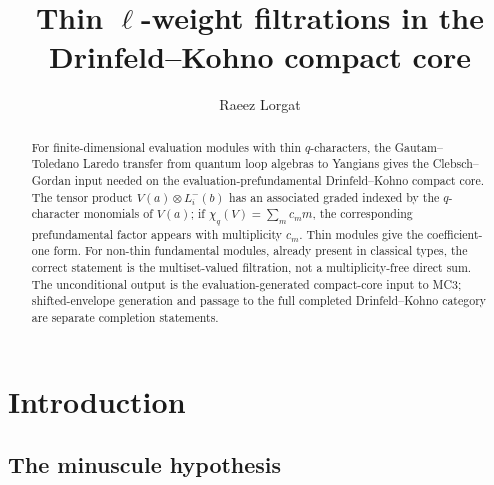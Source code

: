 \documentclass[11pt,reqno]{amsart}
\theoremstyle{definition}
\theoremstyle{remark}
\numberwithin{equation}{section}
\begin{document}
\title[Thin $\ell$-weight filtrations in the Drinfeld--Kohno core]
{Thin $\ell$-weight filtrations in the\\
Drinfeld--Kohno compact core}

\author{Raeez Lorgat}
\address{Department of Mathematics, Harvard University,
 Cambridge, MA 02138, USA}

\date{}

\begin{abstract}
For finite-dimensional evaluation modules with thin
$q$-characters, the Gautam--Toledano Laredo transfer from quantum
loop algebras to Yangians gives the Clebsch--Gordan input needed on
the evaluation-prefundamental Drinfeld--Kohno compact core. The
tensor product $V(a)\otimes L^-_i(b)$ has an associated graded
indexed by the $q$-character monomials of $V(a)$; if
$\chi_q(V)=\sum_m c_m m$, the corresponding prefundamental factor
appears with multiplicity $c_m$. Thin modules give the
coefficient-one form. For non-thin fundamental modules, already
present in classical types, the correct statement is the
multiset-valued filtration, not a multiplicity-free direct sum.
The unconditional output is the evaluation-generated compact-core
input to MC3; shifted-envelope generation and passage to the full
completed Drinfeld--Kohno category are separate completion
statements.
\end{abstract}



\maketitle

\section{Introduction}
\label{sec:intro}

\subsection{The minuscule hypothesis}
\end{document}
